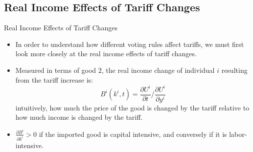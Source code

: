 \documentclass[aspectratio=169]{beamer}
\begin{document}
\subsection{Real Income Effects of Tariff Changes}


\begin{frame}{Real Income Effects of Tariff Changes}

\begin{itemize}
    \item<1-> In order to understand how different voting rules affect tariffs, we must first look more closely at the real income effects of tariff changes.
    \item<2-> Measured in terms of good $ 2 $, the real income change of individual $ i $ resulting from the tariff increase is:
    \begin{equation*}
        B^{i}\left( k^{i}, t \right) = \frac{\partial U^{i}}{\partial t} / \frac{\partial U^{i}}{\partial y^{i}}
    \end{equation*}
    intuitively, how much the price of the good is changed by the tariff relative to how much income is changed by the tariff.
    \item<3-> $ \frac{\partial B^{i}}{\partial k^{i}} > 0 $ if the imported good is capital intensive, and conversely if it is labor-intensive.
\end{itemize} 
    
\end{frame}

\end{document}

